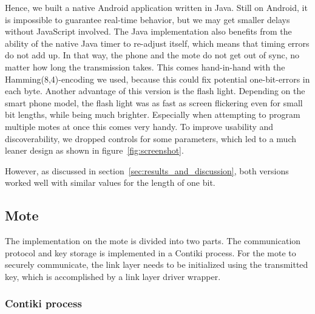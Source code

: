 \documentclass{sig-alternate} %
\begin{document}

Hence, we built a native Android application written in Java.
Still on Android, it is impossible to guarantee real-time behavior, but we may get smaller delays without JavaScript involved.
The Java implementation also benefits from the ability of the native Java timer to re-adjust itself, which means that timing errors do not add up.
In that way, the phone and the mote do not get out of sync, no matter how long the transmission takes.
This comes hand-in-hand with the Hamming(8,4)-encoding we used, because this could fix potential one-bit-errors in each byte.
Another advantage of this version is the flash light.
Depending on the smart phone model, the flash light was as fast as screen flickering even for small bit lengths, while being much brighter.
Especially when attempting to program multiple motes at once this comes very handy.
To improve usability and discoverability, we dropped controls for some parameters, which led to a much leaner design as shown in figure~\ref{fig:screenshot}.

However, as discussed in section~\ref{sec:results_and_discussion}, both versions worked well with similar values for the length of one bit.

\subsection{Mote}
\label{sub:mote}

The implementation on the mote is divided into two parts.
The communication protocol and key storage is implemented in a Contiki process.
For the mote to securely communicate, the link layer needs to be initialized using the transmitted key, which is accomplished by a link layer driver wrapper.

\subsubsection{Contiki process}
\label{ssub:contiki_process}
\end{document}
